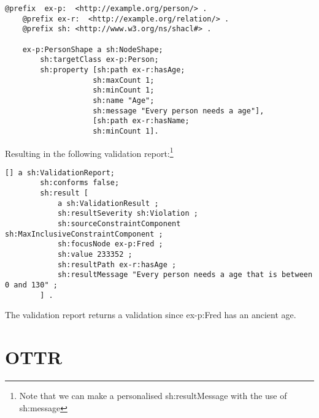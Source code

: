\begin{lstlisting}[frame=single, language=turtle, frame=none]
    @prefix  ex-p:  <http://example.org/person/> . 
    @prefix ex-r:  <http://example.org/relation/> . 
    @prefix sh:	<http://www.w3.org/ns/shacl#> .

    ex-p:PersonShape a sh:NodeShape;
        sh:targetClass ex-p:Person;
        sh:property [sh:path ex-r:hasAge; 
                    sh:maxCount 1;
                    sh:minCount 1;
                    sh:name "Age";
                    sh:message "Every person needs a age"],
                    [sh:path ex-r:hasName;
                    sh:minCount 1].
\end{lstlisting}
Resulting in the following validation report:\footnote{Note that we can make a personalised sh:resultMessage with the use of sh:message}
\begin{lstlisting}[frame=single, language=turtle, frame=none]
    [] a sh:ValidationReport;
        sh:conforms false;
        sh:result [
            a sh:ValidationResult ;
            sh:resultSeverity sh:Violation ;
            sh:sourceConstraintComponent sh:MaxInclusiveConstraintComponent ;
            sh:focusNode ex-p:Fred ;
            sh:value 233352 ;
            sh:resultPath ex-r:hasAge ;
            sh:resultMessage "Every person needs a age that is between 0 and 130" ;
        ] .        
\end{lstlisting}
The validation report returns a validation since ex-p:Fred has an ancient age.

\section{OTTR}
\label{OTTR}